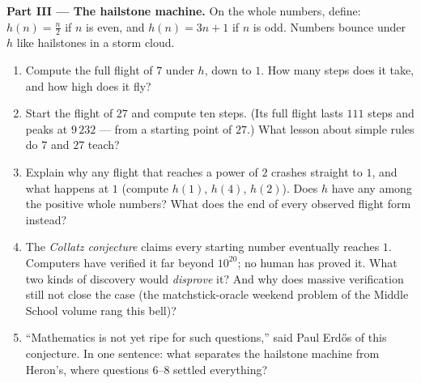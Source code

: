 \begin{problem}
\medskip
\noindent\textbf{Part III --- The hailstone machine.}
On the whole numbers, define: $h(n) = \frac n2$ if $n$ is even,
and $h(n) = 3n + 1$ if $n$ is odd. Numbers bounce under $h$ like
hailstones in a storm cloud.
\begin{enumerate}[resume]
  \item Compute the full flight of $7$ under $h$, down to $1$.
        How many steps does it take, and how high does it fly?
  \item Start the flight of $27$ and compute ten steps. (Its
        full flight lasts $111$ steps and peaks at $9\,232$ ---
        from a starting point of $27$.) What lesson about simple
        rules do $7$ and $27$ teach?
  \item Explain why any flight that reaches a power of $2$
        crashes straight to $1$, and what happens at $1$
        (compute $h(1)$, $h(4)$, $h(2)$). Does $h$ have any
         among the positive whole numbers? What does
        the end of every observed flight form instead?
  \item The \emph{Collatz conjecture} claims every starting
        number eventually reaches $1$. Computers have verified
        it far beyond $10^{20}$; no human has proved it. What
        two kinds of discovery would \emph{disprove} it? And why
        does massive verification still not close the case
        (the matchstick-oracle weekend problem of the Middle School volume rang this bell)?
  \item ``Mathematics is not yet ripe for such questions,'' said
        Paul Erd\H{o}s of this conjecture. In one sentence: what
        separates the hailstone machine from Heron's, where
        questions 6--8 settled everything?
\end{enumerate}


\end{problem}
